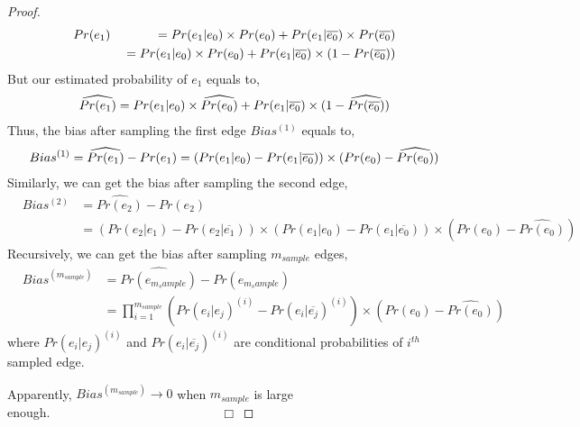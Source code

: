 \documentclass[runningheads,a4paper]{llncs}
\begin{document}
\begin{proof}
\vspace{-0.6cm}
{\setlength\arraycolsep{1pt}
\small
\begin{eqnarray}
\label{eq:egSPr}
& Pr(e_1) & = Pr(e_1|e_0) \times Pr(e_0) + Pr(e_1|\overline{e_0}) \times Pr(\overline{e_0}) {}
\nonumber \\
&&{}= Pr(e_1|e_0) \times Pr(e_0) + Pr(e_1|\overline{e_0}) \times (1-Pr(\overline{e_0}))
\vspace{-0.6cm}
\end{eqnarray}}
But our estimated probability of $e_1$ equals to,
\vspace{-0.3cm}
{\setlength\arraycolsep{1pt}
\small
\begin{eqnarray*}
\label{eq:egSPr}
\widehat{Pr(e_1)}=Pr(e_1|e_0)\times\widehat{Pr(e_0)}+Pr(e_1|\overline{e_0})\times(1-\widehat{Pr(\overline{e_0})})
\vspace{-0.4cm}
\end{eqnarray*}}
Thus, the bias after sampling the first edge $Bias^{(1)}$ equals to,
\vspace{-0.3cm}
{\setlength\arraycolsep{1pt}
\small
\begin{eqnarray*}
\label{eq:egSPr}
Bias^{(1)} = \widehat{Pr(e_1)}-Pr(e_1)= (Pr(e_1|e_0)-Pr(e_1|\overline{e_0}))\times(Pr(e_0)-\widehat{Pr(e_0)})
\vspace{-0.3cm}
\end{eqnarray*}}
Similarly, we can get the bias after sampling the second edge,
\vspace{-0.2cm}
{\setlength\arraycolsep{1pt}
\small
\begin{eqnarray*}
\label{eq:egSPr}
& Bias^{(2)} & = \widehat{Pr(e_2)}-Pr(e_2) {} \\
&& {}=(Pr(e_2|e_1)-Pr(e_2|\overline{e_1}))\times (Pr(e_1|e_0)-Pr(e_1|\overline{e_0}))\times(Pr(e_0)-\widehat{Pr(e_0)})
\end{eqnarray*}
\vspace{-0.2cm}}
Recursively, we can get the bias after sampling $m_{sample}$ edges,
{\setlength\arraycolsep{1pt}
\small
\begin{eqnarray*}
\label{eq:egSPr}
& Bias^{(m_{sample})} & = \widehat{Pr(e_{m_sample})}-Pr(e_{m_sample}) {} \\
&& {}=\prod_{i=1}^{m_{sample}}(Pr(e_i|e_j)^{(i)}-Pr(e_i|\overline{e_j})^{(i)})\times(Pr(e_0)-\widehat{Pr(e_0)})
\end{eqnarray*}}
where $Pr(e_i|e_j)^{(i)}$ and $Pr(e_i|\overline{e_j})^{(i)}$ are conditional probabilities of $i^{th}$ sampled edge.

Apparently, $Bias^{(m_{sample})}\rightarrow 0$ when $m_{sample}$ is large enough.~~~~~~~~~~~~~~~~~~~~~~~~~~~$\Box$

\end{proof}
\end{document}
